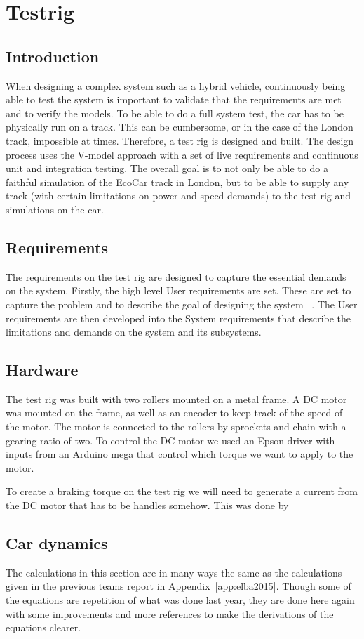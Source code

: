 \chapter{Testrig}
\section{Introduction}
When designing a complex system such as a hybrid vehicle, continuously being
able to test the system is important to validate that the requirements are met
and to verify the models. To be able to do a full system test, the car has to be
physically run on a track. This can be cumbersome, or in the case of the London
track, impossible at times. Therefore, a test rig is designed and built. The
design process uses the V-model approach with a set of live requirements and
continuous unit and integration testing. The overall goal is to not only be able
to do a faithful simulation of the EcoCar track in London, but to be able to
supply any track (with certain limitations on power and speed demands) to the
test rig and simulations on the car.

\section{Requirements}
The requirements on the test rig are designed to capture the essential demands
on the system. Firstly, the high level User requirements are set. These are set
to capture the problem and to describe the goal of designing the system
~\cite{ibm_req}. The User requirements are then developed into the System
requirements that describe the limitations and demands on the system and its
subsystems.

\section{Hardware}
The test rig was built with two rollers mounted on a metal frame. A DC motor was mounted on the frame, as well as an encoder to keep track of the speed of the motor. The motor is connected to the rollers by sprockets and chain with a gearing ratio of two. To control the DC motor we used an Epson driver with inputs from an Arduino mega that control which torque we want to apply to the motor. 

To create a braking torque on the test rig we will need to generate a current from the DC motor that has to be handles somehow. This was done by 


\section{Car dynamics} \label{sec:cardynamics}
The calculations in this section are in many ways the same as the calculations
given in the previous teams report in Appendix~\ref{app:elba2015}. Though some
of the equations are repetition of what was done last year, they are
done here again with some improvements and more references to make the
derivations of the equations clearer.

